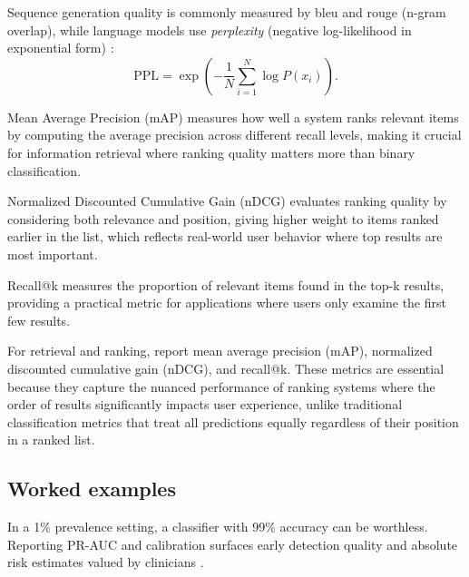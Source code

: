 Sequence generation quality is commonly measured by \gls{bleu}  and \gls{rouge}  (n-gram overlap), while language models use \emph{perplexity} (negative log-likelihood in exponential form) \textcite{GoodfellowEtAl2016,D2LChapterRNN}:
\begin{equation}
\text{PPL} = \exp\left(-\frac{1}{N} \sum_{i=1}^{N} \log P(x_i)\right).
\end{equation}

\begin{remark}
Mean Average Precision (mAP) measures how well a system ranks relevant items by computing the average precision across different recall levels, making it crucial for information retrieval where ranking quality matters more than binary classification.
\end{remark}

\begin{remark}
Normalized Discounted Cumulative Gain (nDCG) evaluates ranking quality by considering both relevance and position, giving higher weight to items ranked earlier in the list, which reflects real-world user behavior where top results are most important.
\end{remark}

\begin{remark}[Recall@k]
Recall@k measures the proportion of relevant items found in the top-k results, providing a practical metric for applications where users only examine the first few results.
\end{remark}

For retrieval and ranking, report mean average precision (mAP), normalized discounted cumulative gain (nDCG), and recall@k. These metrics are essential because they capture the nuanced performance of ranking systems where the order of results significantly impacts user experience, unlike traditional classification metrics that treat all predictions equally regardless of their position in a ranked list.


\subsection{Worked examples}

\begin{example}
In a 1\% prevalence setting, a classifier with 99\% accuracy can be worthless. Reporting PR-AUC and calibration surfaces early detection quality and absolute risk estimates valued by clinicians \textcite{Ronneberger2015}.
\end{example}

